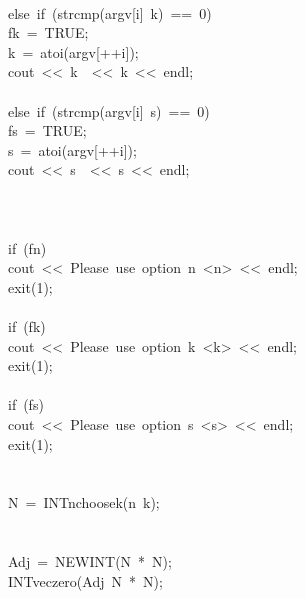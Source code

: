 \begin{tabbing}
\>\>\>\\[0pt]
\>\>else\ if\ (strcmp(argv[i]\ k)\ ==\ 0)\ \\[0pt]
\>\>\>fk\ =\ TRUE;\\[0pt]
\>\>\>k\ =\ atoi(argv[++i]);\\[0pt]
\>\>\>cout\ <<\ k\ \ <<\ k\ <<\ endl;\\[0pt]
\>\>\>\\[0pt]
\>\>else\ if\ (strcmp(argv[i]\ s)\ ==\ 0)\ \\[0pt]
\>\>\>fs\ =\ TRUE;\\[0pt]
\>\>\>s\ =\ atoi(argv[++i]);\\[0pt]
\>\>\>cout\ <<\ s\ \ <<\ s\ <<\ endl;\\[0pt]
\>\>\>\\[0pt]
\>\>\\[0pt]
\\[0pt]
\>if\ (fn)\ \\[0pt]
\>\>cout\ <<\ Please\ use\ option\ n\ <n>\ <<\ endl;\\[0pt]
\>\>exit(1);\\[0pt]
\>\>\\[0pt]
\>if\ (fk)\ \\[0pt]
\>\>cout\ <<\ Please\ use\ option\ k\ <k>\ <<\ endl;\\[0pt]
\>\>exit(1);\\[0pt]
\>\>\\[0pt]
\>if\ (fs)\ \\[0pt]
\>\>cout\ <<\ Please\ use\ option\ s\ <s>\ <<\ endl;\\[0pt]
\>\>exit(1);\\[0pt]
\>\>\\[0pt]
\\[0pt]
\>N\ =\ INTnchoosek(n\ k);\\[0pt]
\>\\[0pt]
\\[0pt]
\>Adj\ =\ NEWINT(N\ *\ N);\\[0pt]
\>INTveczero(Adj\ N\ *\ N);\\[0pt]

\end{tabbing}
